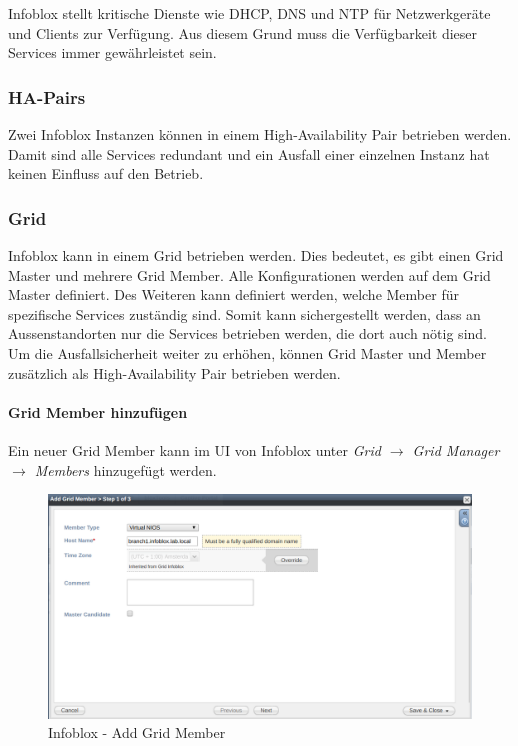 Infoblox stellt kritische Dienste wie DHCP, DNS und NTP für Netzwerkgeräte und Clients zur Verfügung. Aus diesem Grund muss die Verfügbarkeit dieser Services immer gewährleistet sein.

\subsubsection{HA-Pairs}
Zwei Infoblox Instanzen können in einem High-Availability Pair betrieben werden. Damit sind alle Services redundant und ein Ausfall einer einzelnen Instanz hat keinen Einfluss auf den Betrieb. 

\subsubsection{Grid}
Infoblox kann in einem Grid betrieben werden. Dies bedeutet, es gibt einen Grid Master und mehrere Grid Member. Alle Konfigurationen werden auf dem Grid Master definiert. Des Weiteren kann definiert werden, welche Member für spezifische Services zuständig sind. Somit kann sichergestellt werden, dass an Aussenstandorten nur die Services betrieben werden, die dort auch nötig sind. Um die Ausfallsicherheit weiter zu erhöhen, können Grid Master und Member zusätzlich als High-Availability Pair betrieben werden.

\paragraph{Grid Member hinzufügen}

Ein neuer Grid Member kann im UI von Infoblox unter \textit{Grid $\rightarrow$ Grid Manager $\rightarrow$ Members} hinzugefügt werden.

\begin{figure}[H]
	\centering
	\includegraphics[width=1\linewidth]{img/Absicherung/Infoblox_Add_Grid_Member.png}
	\caption{Infoblox - Add Grid Member}
	\label{fig:Infoblox - Add Grid Member}
\end{figure}

